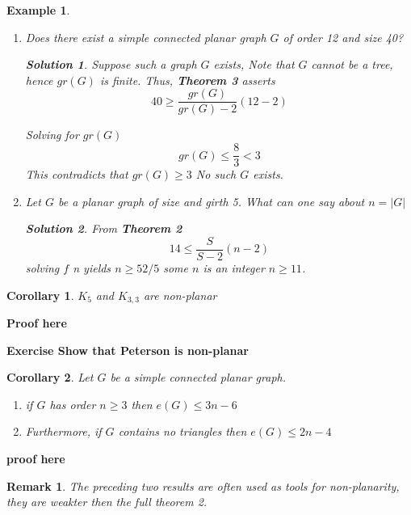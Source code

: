 \documentclass[12pt]{article}
\newtheorem*{corollary}{Corollary}
\newtheorem{example}{Example}
\newtheorem*{remark}{Remark}
\newtheorem{solution}{Solution}
\begin{document}
\begin{example}

\begin{enumerate}


\item  Does there exist a simple connected planar graph $G$ of order 12 and size 40?
\begin{solution}

  Suppose such a graph $G$ exists, Note that $G$ cannot be a tree, hence  $gr(G)$ is finite. Thus, \textbf{Theorem 3} asserts
  \[40 \ge \frac{gr(G)}{gr(G) - 2} (12 - 2)\]

Solving for $gr(G)$
\[gr(G) \le \frac{8}{3} < 3\]
This contradicts that $gr(G) \ge 3$ No such $G$ exists.
\end{solution}

\item Let $G$ be a planar graph of size  and girth 5. What can one  say about $n = \vert G\vert$

\begin{solution}
  From \textbf{Theorem 2}
  \[14 \le \frac{S}{S-2} (n-2)\]
solving $f$ n yields $n\ge 52/5$ some $n$ is an integer $n\ge 11$.
        \end{solution}
\end{enumerate}
\end{example}


\begin{corollary}
$K_{5}$ and $K_{3,3}$ are non-planar
\end{corollary}


\textbf{Proof here}


\textbf{Exercise Show that Peterson is non-planar}


\begin{corollary}
  Let $G$ be a simple connected planar graph.
  \begin{enumerate}
    \item if $G$ has order $n\ge 3$ then $e(G) \le 3n - 6$
          \item Furthermore, if $G$ contains no triangles then $e(G) \le 2n - 4$
  \end{enumerate}

\end{corollary}

\textbf{proof here}


\begin{remark}
The preceding two results are often used as tools for non-planarity, they are weakter then the full theorem 2.
\end{remark}
\end{document}
